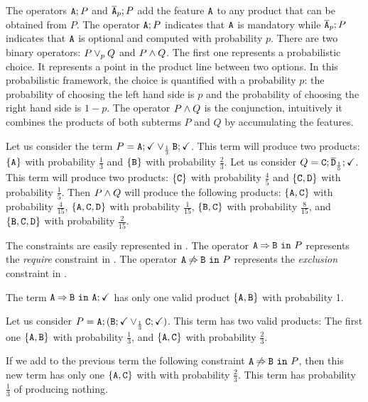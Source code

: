 The operators $\mathtt{A};P$ and $\overline{\mathtt{A}}_{p};P$ add the feature $\mathtt{A}$ to any product that can be obtained
from $P$. The operator $\mathtt{A};P$ indicates that $\mathtt{A}$ is mandatory while $\overline{\mathtt{A}}_{p};P$ indicates
that $\mathtt{A}$ is optional and computed with probability $p$.
There are two binary operators: $P \mathbin{\lor}_{p} Q$ and $P\mathbin{\wedge} Q$. The
first one represents a probabilistic choice. It represents a point in
the product line between two options. In this probabilistic framework,
the choice is quantified with a probability \(p\): the probability of
choosing the left hand side is \(p\) and the probability of choosing
the right hand side is \(1-p\). The operator $P\mathbin{\wedge} Q$ is the
conjunction, intuitively it combines the products of both subterms
\(P\) and \(Q\) by accumulating the features.

\begin{example}
  Let us consider the term
  $P=\mathtt{A};\checkmark\mathbin{\lor}_{\frac{1}{3}}{\mathtt{B}};\checkmark$. This
  term will produce two products: $\{{\mathtt{A}}\}$ with probability
  \(\frac{1}{3}\)
  and \(\{{\mathtt{B}}\}\) with probability \(\frac{2}{3}\).
  Let us consider $Q={\mathtt{C}};\overline{\mathtt{D}}_{\frac{1}{5}};\checkmark$. This term will
  produce
  two products: \(\{{\mathtt{C}}\}\) with probability \(\frac{4}{5}\) and
  \(\{{\mathtt{C}},{\mathtt{D}}\}\) with probability \(\frac{1}{5}\).
  Then \(P\mathbin{\wedge} Q\) will produce the following products:
  \(\{{\mathtt{A}},{\mathtt{C}}\}\) with probability \(\frac{4}{15}\),
  \(\{{\mathtt{A}},{\mathtt{C}},{\mathtt{D}}\}\) with probability \(\frac{1}{15}\),
  \(\{{\mathtt{B}},{\mathtt{C}}\}\) with probability \(\frac{8}{15}\), and
  \(\{{\mathtt{B}},{\mathtt{C}},{\mathtt{D}}\}\) with probability \(\frac{2}{15}\).

\end{example}

The constraints are easily represented in \fodaPAp.
The operator $\mathtt{A}\mathbin{\Rightarrow}\mathtt{B}\ \mathtt{in}\ P$ represents the \emph{require}
constraint in \FODA.
The operator $\mathtt{A}\mathbin{\not\Rightarrow}\mathtt{B}\ \mathtt{in}\ P$ represents the \emph{exclusion}
constraint in \FODA.

    \bex
      The term $\mathtt{A}\mathbin{\Rightarrow}\mathtt{B}\ \mathtt{in}\ \mathtt{A};\checkmark$ has only one valid
      product $\{\mathtt{A}, \mathtt{B}\}$ with  probability 1.

      Let us consider
      $P=\mathtt{A};(\mathtt{B};\checkmark\mathbin{\lor}_{\frac{1}{3}}\mathtt{C};\checkmark)$.
      This
      term has two valid products: The first one
      $\{\mathtt{A},\mathtt{B}\}$ with probability $\frac{1}{3}$,
      and $\{\mathtt{A}, \mathtt{C}\}$ with probability $\frac{2}{3}$.

      If we add to the previous term the following constraint
      $\mathtt{A}\mathbin{\not\Rightarrow}\mathtt{B}\ \mathtt{in}\ P$, then this new term  has only one
      $\{\mathtt{A},\mathtt{C}\}$ with  with probability
      $\frac{2}{3}$.
      This term has probability $\frac{1}{3}$ of producing nothing.
    \eex


